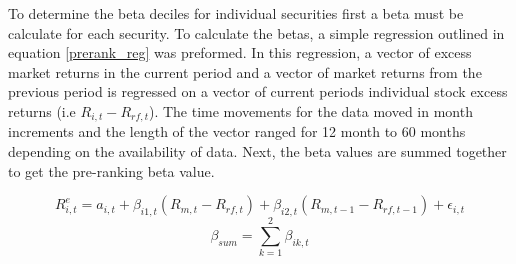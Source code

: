 To determine the beta deciles for individual securities first a beta must be calculate for each security. To calculate the betas, a  simple regression outlined in equation \eqref{prerank_reg} was preformed. In this regression, a vector of  excess market returns in the current period and a vector of market returns from the previous period is regressed on a vector of current periods individual stock excess returns (i.e $R_{i,t}-R_{rf,t}$). The time movements for the data moved in month increments and the length of the vector ranged for 12 month to 60 months depending on the availability of data. Next, the beta values are summed together to get the pre-ranking beta value. 

\begin{equation}
    R_{i,t}^e = a_{i,t} + \beta_{i1,t}(R_{m,t}-R_{rf,t})+\beta_{i2,t}(R_{m,t-1}-R_{rf,t-1})+\epsilon_{i,t}
    \label{prerank_reg}
\end{equation}
\begin{equation}
    \beta_{sum} = \sum_{k=1}^2\beta_{ik,t}
\end{equation}
